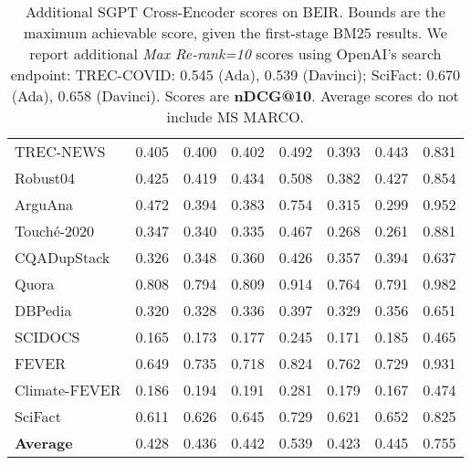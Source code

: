 \documentclass{article}
\begin{document}
\begin{table*}[!h]
{\begin{tabular}{l | c | c c c | c c c }
    TREC-NEWS & 0.405
    & 0.400
    & 0.402
    & 0.492
    & 0.393
    & 0.443
    & 0.831\\
    
    Robust04 & 0.425
    & 0.419
    & 0.434
    & 0.508
    & 0.382
    & 0.427
    & 0.854\\ \midrule
    
    ArguAna & 0.472
    & 0.394
    & 0.383
    & 0.754
    & 0.315
    & 0.299
    & 0.952\\  
    
    Touché-2020 & 0.347
    & 0.340
    & 0.335
    & 0.467
    & 0.268
    & 0.261
    & 0.881\\ \midrule 
    
    CQADupStack & 0.326 
    & 0.348
    & 0.360
    & 0.426
    & 0.357
    & 0.394
    & 0.637\\
   
    Quora & 0.808
    & 0.794
    & 0.809
    & 0.914
    & 0.764
    & 0.791
    & 0.982\\ \midrule
    
    DBPedia & 0.320
    & 0.328
    & 0.336
    & 0.397
    & 0.329
    & 0.356
    & 0.651\\ \midrule
   
    SCIDOCS & 0.165
    & 0.173
    & 0.177
    & 0.245
    & 0.171
    & 0.185
    & 0.465\\ \midrule
   
    FEVER & 0.649 
    & 0.735
    & 0.718
    & 0.824
    & 0.762
    & 0.729
    & 0.931\\ 
    
    Climate-FEVER & 0.186
    & 0.194
    & 0.191
    & 0.281
    & 0.179
    & 0.167
    & 0.474 \\ 
    
    SciFact & 0.611
    & 0.626
    & 0.645
    & 0.729 
    & 0.621
    & 0.652
    & 0.825\\ \midrule
  
    \textbf{Average} & 0.428
    & 0.436
    & 0.442
    & 0.539
    & 0.423
    & 0.445
    & 0.755\\

    \bottomrule
    \end{tabular}}
    \caption{Additional SGPT Cross-Encoder scores on BEIR. Bounds are the maximum achievable score, given the first-stage BM25 results. We report additional \textit{Max Re-rank=10} scores using OpenAI's search endpoint: TREC-COVID: 0.545 (Ada), 0.539 (Davinci); SciFact: 0.670 (Ada), 0.658 (Davinci). Scores are \textbf{nDCG@10}. Average scores do not include MS MARCO.}
    \label{tab:beirceextra}
\end{table*}
\end{document}
